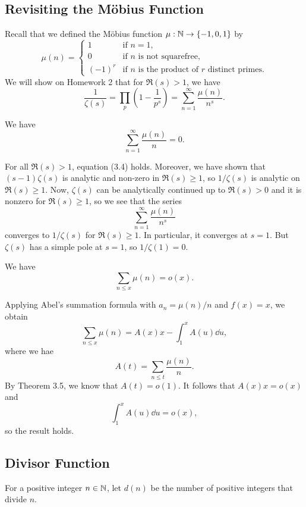 \subsection{Revisiting the M\"obius Function}
Recall that we defined the M\"obius function $\mu : \mathbb{N} \to \{-1, 0, 1\}$ by 
\[ \mu(n) = \begin{cases} 1 & \text{if } n = 1, \\ 0 & \text{if $n$ is not squarefree,} \\ (-1)^r & \text{if $n$ is the product of $r$ distinct primes.} \end{cases} \]
We will show on Homework 2 that for $\Re(s) > 1$, we have 
\[ \frac1{\zeta(s)} = \prod_p \left( 1 - \frac1{p^s} \right) = \sum_{n=1}^\infty \frac{\mu(n)}{n^s}. \]

\begin{thm}
We have 
\[ \sum_{n=1}^\infty \frac{\mu(n)}n = 0. \]
\end{thm}
\begin{pf}
For all $\Re(s) > 1$, equation (3.4) holds. Moreover, we have shown that $(s-1)\zeta(s)$ is analytic 
and non-zero in $\Re(s) \geq 1$, so $1/\zeta(s)$ is analytic on $\Re(s) \geq 1$. 
Now, $\zeta(s)$ can be analytically continued up to $\Re(s) > 0$ and it is nonzero for $\Re(s) \geq 1$,
so we see that the series 
\[ \sum_{n=1}^\infty \frac{\mu(n)}{n^s} \] 
converges to $1/\zeta(s)$ for $\Re(s) \geq 1$. In particular, it converges at $s = 1$. But 
$\zeta(s)$ has a simple pole at $s = 1$, so $1/\zeta(1) = 0$. 
\end{pf}

\begin{thm}
We have 
\[ \sum_{n\leq x} \mu(n) = o(x). \]
\end{thm}
\begin{pf}
Applying Abel's summation formula with $a_n = \mu(n) / n $ and $f(x) = x$, we obtain 
\[ \sum_{n\leq x} \mu(n) = A(x)x - \int_1^x A(u)\dd u, \]
where we hae 
\[ A(t) = \sum_{n\leq t} \frac{\mu(n)}n. \]
By Theorem 3.5, we know that $A(t) = o(1)$. It follows that $A(x) x = o(x)$ and 
\[ \int_1^x A(u)\dd u = o(x), \]
so the result holds. 
\end{pf}

\subsection{Divisor Function}

\begin{defn}
For a positive integer $n \in \mathbb{N}$, let $d(n)$ be the number of positive integers that 
divide $n$. 
\end{defn}

